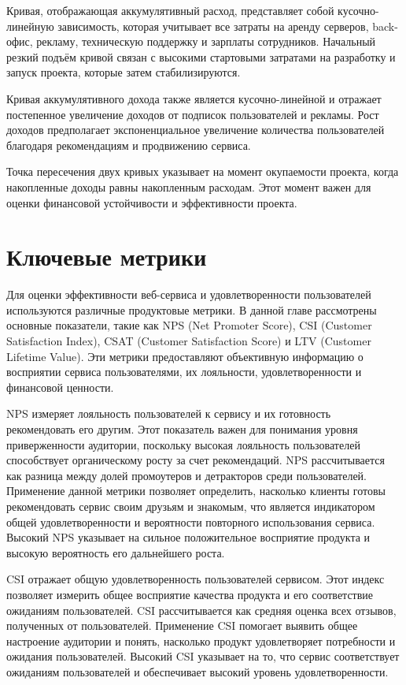 Кривая, отображающая аккумулятивный расход, представляет собой кусочно-линейную зависимость, которая учитывает все затраты на аренду серверов, back-офис, рекламу, техническую поддержку и зарплаты сотрудников. Начальный резкий подъём кривой связан с высокими стартовыми затратами на разработку и запуск проекта, которые затем стабилизируются.

Кривая аккумулятивного дохода также является кусочно-линейной и отражает постепенное увеличение доходов от подписок пользователей и рекламы. Рост доходов предполагает экспоненциальное увеличение количества пользователей благодаря рекомендациям и продвижению сервиса.

Точка пересечения двух кривых указывает на момент окупаемости проекта, когда накопленные доходы равны накопленным расходам. Этот момент важен для оценки финансовой устойчивости и эффективности проекта.

\section{Ключевые метрики}

Для оценки эффективности веб-сервиса и удовлетворенности пользователей используются различные продуктовые метрики. В данной главе рассмотрены основные показатели, такие как NPS (Net Promoter Score), CSI (Customer Satisfaction Index), CSAT (Customer Satisfaction Score) и LTV (Customer Lifetime Value). Эти метрики предоставляют объективную информацию о восприятии сервиса пользователями, их лояльности, удовлетворенности и финансовой ценности.

NPS измеряет лояльность пользователей к сервису и их готовность рекомендовать его другим. Этот показатель важен для понимания уровня приверженности аудитории, поскольку высокая лояльность пользователей способствует органическому росту за счет рекомендаций. NPS рассчитывается как разница между долей промоутеров и детракторов среди пользователей. Применение данной метрики позволяет определить, насколько клиенты готовы рекомендовать сервис своим друзьям и знакомым, что является индикатором общей удовлетворенности и вероятности повторного использования сервиса. Высокий NPS указывает на сильное положительное восприятие продукта и высокую вероятность его дальнейшего роста.

CSI отражает общую удовлетворенность пользователей сервисом. Этот индекс позволяет измерить общее восприятие качества продукта и его соответствие ожиданиям пользователей. CSI рассчитывается как средняя оценка всех отзывов, полученных от пользователей. Применение CSI помогает выявить общее настроение аудитории и понять, насколько продукт удовлетворяет потребности и ожидания пользователей. Высокий CSI указывает на то, что сервис соответствует ожиданиям пользователей и обеспечивает высокий уровень удовлетворенности.

